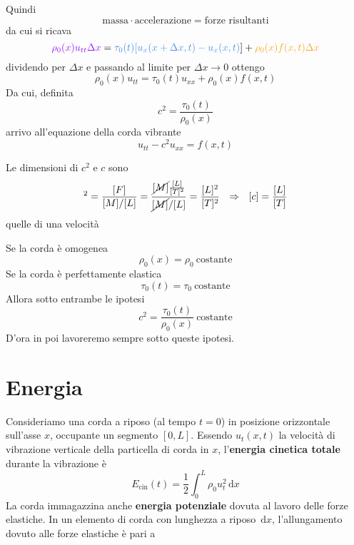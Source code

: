 \documentclass[10pt,a4paper,twoside,openright]{book}
\newcommand{\de}{\,\mathrm d}
\newcommand{\dx}{\de x}
\begin{document}
Quindi
\begin{equation*}
\text{massa} \cdotp \text{accelerazione} =\text{forze risultanti}
\end{equation*}
da cui si ricava
\begin{equation*}
\textcolor[rgb]{0.56,0.07,1}{\rho _{0}(x) u_{tt} \Delta x} =\textcolor[rgb]{0.29,0.56,0.89}{\tau _{0}(t)[u_{x}(x+\Delta x,t)-u_{x}(x,t)}] +\textcolor[rgb]{0.96,0.65,0.14}{\rho _{0}(x)f(x,t)\Delta x}
\end{equation*}
dividendo per $\displaystyle \Delta x$ e passando al limite per $\displaystyle \Delta x\rightarrow 0$ ottengo
\begin{equation*}
\rho _{0}(x) u_{tt} =\tau _{0}(t) u_{xx} +\rho _{0} (x)f(x,t)
\end{equation*}
Da cui, definita
\begin{equation*}
c^{2} =\frac{\tau _{0}(t)}{\rho _{0}(x)}
\end{equation*}
arrivo all'equazione della corda vibrante
\begin{equation}
\boxed{u_{tt} -c^{2} u_{xx} =f(x,t)}
\end{equation}
\begin{nb}
	Le dimensioni di $\displaystyle c^{2}$ e $c$ sono
	\begin{equation*}
		[ c]^{2} =\frac{[ F]}{[ M] /[ L]} =\frac{\cancel{[ M]}\frac{[ L]}{[ T]^{2}}}{\cancel{[ M]} /[ L]} =\frac{[ L]^{2}}{[ T]^{2}} \ \ \Rightarrow \ \ [ c] =\frac{[ L]}{[ T]}
	\end{equation*}
	quelle di una velocità
\end{nb}
\begin{nb}
	Se la corda è omogenea
	\begin{equation*}
		\rho _{0}(x) =\rho _{0} \ \text{costante}
	\end{equation*}
	Se la corda è perfettamente elastica
	\begin{equation*}
		\tau _{0}(t) =\tau _{0} \ \text{costante}
	\end{equation*}
	Allora sotto entrambe le ipotesi
	\begin{equation*}
		c^{2} =\frac{\tau _{0}(t)}{\rho _{0}(x)} \ \text{costante}
	\end{equation*}
	D'ora in poi lavoreremo sempre sotto queste ipotesi.
\end{nb}
\section{Energia}

Consideriamo una corda a riposo (al tempo $t=0$) in posizione orizzontale sull'asse $x$, occupante un segmento $\displaystyle [ 0,L]$. Essendo $\displaystyle u_{t}(x,t)$ la velocità di vibrazione verticale della particella di corda in $x$, l'\textbf{energia cinetica totale }durante la vibrazione è
\begin{equation}
	E_{\text{cin}}(t) =\frac{1}{2}\int ^{L}_{0} \rho _{0} u^{2}_{t} \dx
\end{equation}
La corda immagazzina anche \textbf{energia potenziale} dovuta al lavoro delle forze elastiche. In un elemento di corda con lunghezza a riposo $\dx$, l'allungamento dovuto alle forze elastiche è pari a
\end{document}

